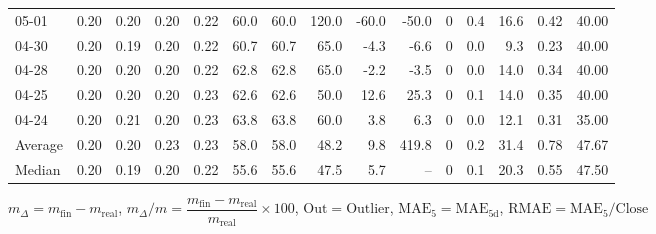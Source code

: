 \begin{threeparttable}
{\begin{tabular}{lrrrrrrrrrrrrrr}
  05-01 &          0.20 &          0.20 &          0.20 &        0.22 &                60.0 &               60.0 &               120.0 &      -60.0 &        -50.0 &              0 &                 0.4 &             16.6 &            0.42 &                  40.00 \\
  04-30 &          0.20 &          0.19 &          0.20 &        0.22 &                60.7 &               60.7 &                65.0 &       -4.3 &         -6.6 &              0 &                 0.0 &              9.3 &            0.23 &                  40.00 \\
  04-28 &          0.20 &          0.20 &          0.20 &        0.22 &                62.8 &               62.8 &                65.0 &       -2.2 &         -3.5 &              0 &                 0.0 &             14.0 &            0.34 &                  40.00 \\
  04-25 &          0.20 &          0.20 &          0.20 &        0.23 &                62.6 &               62.6 &                50.0 &       12.6 &         25.3 &              0 &                 0.1 &             14.0 &            0.35 &                  40.00 \\
  04-24 &          0.20 &          0.21 &          0.20 &        0.23 &                63.8 &               63.8 &                60.0 &        3.8 &          6.3 &              0 &                 0.0 &             12.1 &            0.31 &                  35.00 \\
Average &          0.20 &          0.20 &          0.23 &        0.23 &                58.0 &               58.0 &                48.2 &        9.8 &        419.8 &              0 &                 0.2 &             31.4 &            0.78 &                  47.67 \\
 Median &          0.20 &          0.19 &          0.20 &        0.22 &                55.6 &               55.6 &                47.5 &        5.7 &           -- &              0 &                 0.1 &             20.3 &            0.55 &                  47.50 \\
\bottomrule
\end{tabular}
}
\begin{tablenotes}\footnotesize
\item $m_\Delta=m_{\text{fin}}-m_{\text{real}}$,
$m_\Delta/m=\dfrac{m_{\text{fin}}-m_{\text{real}}}{m_{\text{real}}}\times100$,
$\mathrm{Out}=\text{Outlier}$,
$\mathrm{MAE}_5=\mathrm{MAE}_{5\text{d}}$,
$\mathrm{RMAE}=\mathrm{MAE}_5/\text{Close}$
\end{tablenotes}
\end{threeparttable}
\endgroup

